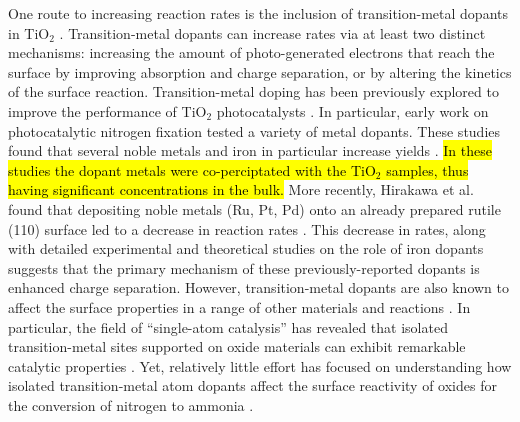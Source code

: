 One route to increasing reaction rates is the inclusion of transition\hyp{}metal dopants in TiO$_2$ \cite{Zaleska_2008}.  Transition\hyp{}metal dopants can increase rates via at least two distinct mechanisms: increasing the amount of photo-generated electrons that reach the surface by improving absorption and charge separation, or by altering the kinetics of the surface reaction.
Transition-metal doping has been previously explored to improve the performance of TiO$_2$ photocatalysts \cite{Schneider_2014, Li_2007, Dozzi_2013}. In particular, early work on photocatalytic nitrogen fixation tested a variety of metal dopants. These studies found that several noble metals \cite{Ranjit_1996} and iron in particular increase yields \cite{Schrauzer_1977, Schrauzer_1983, Augugliaro_1982, Soria_1991, Ranjit_1996, Ranjit_1997}. \hl{In these studies the dopant metals were co-perciptated with the TiO$_2$ samples, thus having significant concentrations in the bulk.} More recently, Hirakawa et al. found that depositing noble metals (Ru, Pt, Pd) onto an already prepared rutile (110) surface led to a decrease in reaction rates \cite{Hirakawa_2017}. This decrease in rates, along with detailed experimental and theoretical studies on the role of iron dopants  \cite{Soria_1991, Comer_2018} suggests that the primary mechanism of these previously-reported dopants is enhanced charge separation. However, transition-metal dopants are also known to affect the surface properties in a range of other materials and reactions \cite{Khan_2018, Gu_2014, Ammal_2016, Gu_2017, Comer_2018, Garc_a_Mota_2011, Yao_2017}. In particular, the field of ``single-atom catalysis'' has revealed that isolated transition-metal sites supported on oxide materials can exhibit remarkable catalytic properties \cite{Liu_2016, Qiao_2011, O_Connor_2018}. Yet, relatively little effort has focused on understanding how isolated transition-metal atom dopants affect the surface reactivity of oxides for the conversion of nitrogen to ammonia \cite{Tao_2019, Liu_2019, Zhao_2019, Cheng_2019, Li_2017}.


